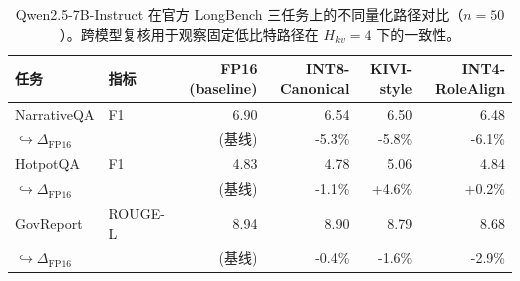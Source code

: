 \begin{table}[!htbp]
\centering
\caption{Qwen2.5-7B-Instruct 在官方 LongBench 三任务上的不同量化路径对比（$n=50$）。跨模型复核用于观察固定低比特路径在 $H_{kv}=4$ 下的一致性。}
\label{tab:official-longbench-7b}
\begin{tabular}{llrrrr}
\toprule
任务 & 指标 & FP16 (baseline) & INT8-Canonical & KIVI-style & INT4-RoleAlign \\
\midrule
NarrativeQA & F1 & 6.90 & 6.54 & 6.50 & 6.48 \\
$\hookrightarrow \Delta_{\text{FP16}}$ &  & (基线) & -5.3\% & -5.8\% & -6.1\% \\
HotpotQA & F1 & 4.83 & 4.78 & 5.06 & 4.84 \\
$\hookrightarrow \Delta_{\text{FP16}}$ &  & (基线) & -1.1\% & +4.6\% & +0.2\% \\
GovReport & ROUGE-L & 8.94 & 8.90 & 8.79 & 8.68 \\
$\hookrightarrow \Delta_{\text{FP16}}$ &  & (基线) & -0.4\% & -1.6\% & -2.9\% \\
\bottomrule
\end{tabular}
\end{table}
